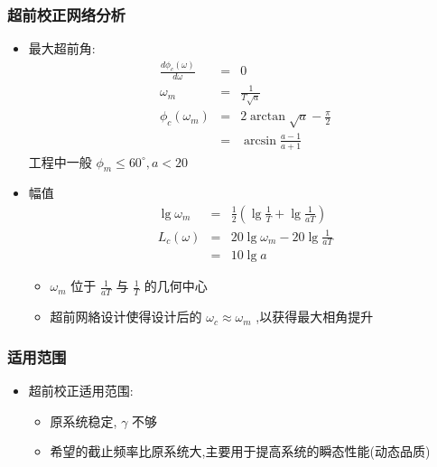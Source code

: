 \documentclass[table]{article}
\begin{document}
\begin{frame}
\begin{itemize}

\end{itemize} %
\end{frame}
\begin{frame}
\frametitle{超前校正网络分析}
\label{sec-2-1-2}
\begin{itemize}

\item 最大超前角:
\label{sec-2-1-2-1}%
\begin{eqnarray*}
\frac{d\phi_c(\omega)}{d\omega} & = & 0 \\
\omega_m &=& \frac{1}{T\sqrt{a}}\\
\phi_c(\omega_m) &=& 2\arctan\sqrt{a}-\frac{\pi}{2}\\
                 &=& \arcsin\frac{a-1}{a+1}
\end{eqnarray*}
工程中一般 $\phi_m\leq 60^{\circ},a<20$ 

\item 幅值
\label{sec-2-1-2-2}%
\begin{eqnarray*}
\lg\omega_m &=& \frac{1}{2}(\lg\frac{1}{T}+\lg\frac{1}{aT}) \\
L_c(\omega) &=& 20\lg\omega_m-20\lg\frac{1}{aT} \\
            &=& 10\lg a
\end{eqnarray*}
\begin{itemize}
\item <4-> $\omega_m$ 位于 $\frac{1}{aT}$ 与 $\frac{1}{T}$ 的几何中心
\item <5-> 超前网絡设计使得设计后的 $\omega_c\approx\omega_m$ ,以获得最大相角提升
\end{itemize}
\end{itemize} %
\end{frame}
\begin{frame}
\frametitle{适用范围}
\label{sec-2-1-3}

\begin{itemize}
\item 超前校正适用范围:
\begin{itemize}
\item <2->原系统稳定, $\gamma$ 不够
\item <3->希望的截止频率比原系统大,主要用于提高系统的瞬态性能(动态品质)
\end{itemize}
\end{itemize}
\end{frame}
\end{document}
